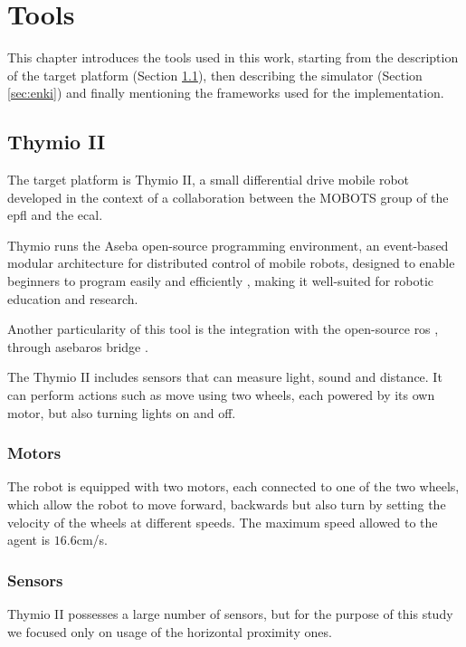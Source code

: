 \chapter{Tools}
\label{chap:impl}

This chapter introduces the tools used in this work, starting from the description 
of the target platform (Section \ref{sec:thymio}), then describing the simulator 
(Section \ref{sec:enki}) and finally mentioning the frameworks used for the 
implementation.

\section{Thymio II}
\label{sec:thymio}

The target platform is Thymio II, a small differential drive mobile robot 
developed 
in the context of a collaboration between the MOBOTS group of the 
\gls{epfl} and 
the \gls{ecal}. 

Thymio runs the Aseba open-source programming environment, an event-based 
modular architecture for distributed control of mobile robots, designed to enable 
beginners to program easily and efficiently \cite[][]{magnenat2010aseba, 
mondada2017bringing}, making it well-suited for robotic education and research.

Another particularity of this tool is the integration with the open-source 
\gls{ros} \cite[][]{quigley2009ros}, through asebaros bridge 
\cite[][]{asebaros}. 

The Thymio II includes sensors that can measure light, sound and distance. 
It can 
perform actions such as move using two wheels, each powered by its own 
motor, 
but also turning lights on and off.

\subsection{Motors}
\label{subsection:thymotors}
The robot is equipped with two motors, each connected to one of the two 
wheels, which allow the robot to move forward, backwards but also turn by 
setting the velocity of the wheels at different speeds. The maximum speed 
allowed 
to the agent is $16.6$\gls{cm/s}.

\subsection{Sensors}
\label{subsec:thysensors}

Thymio II possesses a large number of sensors, but for the purpose of this 
study we focused only on usage of the horizontal proximity ones. 

